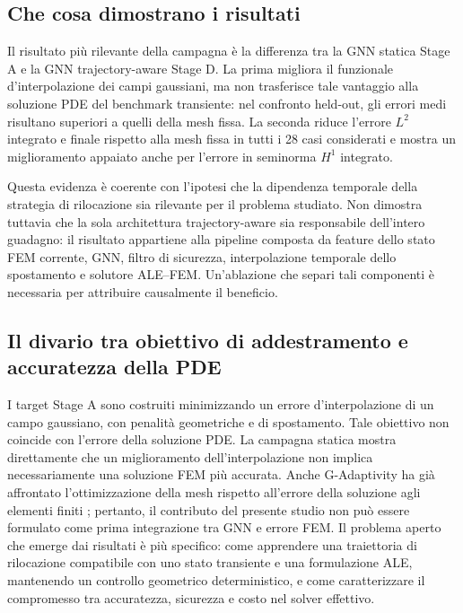 \subsection{Che cosa dimostrano i risultati}

Il risultato più rilevante della campagna è la differenza tra la GNN statica Stage A e la GNN trajectory-aware Stage D. La prima migliora il funzionale d'interpolazione dei campi gaussiani, ma non trasferisce tale vantaggio alla soluzione PDE del benchmark transiente: nel confronto held-out, gli errori medi risultano superiori a quelli della mesh fissa. La seconda riduce l'errore $L^2$ integrato e finale rispetto alla mesh fissa in tutti i 28 casi considerati e mostra un miglioramento appaiato anche per l'errore in seminorma $H^1$ integrato.

Questa evidenza è coerente con l'ipotesi che la dipendenza temporale della strategia di rilocazione sia rilevante per il problema studiato. Non dimostra tuttavia che la sola architettura trajectory-aware sia responsabile dell'intero guadagno: il risultato appartiene alla pipeline composta da feature dello stato FEM corrente, GNN, filtro di sicurezza, interpolazione temporale dello spostamento e solutore ALE--FEM. Un'ablazione che separi tali componenti è necessaria per attribuire causalmente il beneficio.

\subsection{Il divario tra obiettivo di addestramento e accuratezza della PDE}

I target Stage A sono costruiti minimizzando un errore d'interpolazione di un campo gaussiano, con penalità geometriche e di spostamento. Tale obiettivo non coincide con l'errore della soluzione PDE. La campagna statica mostra direttamente che un miglioramento dell'interpolazione non implica necessariamente una soluzione FEM più accurata. Anche G-Adaptivity ha già affrontato l'ottimizzazione della mesh rispetto all'errore della soluzione agli elementi finiti \citep{rowbottom2025gadaptivity}; pertanto, il contributo del presente studio non può essere formulato come prima integrazione tra GNN e errore FEM. Il problema aperto che emerge dai risultati è più specifico: come apprendere una traiettoria di rilocazione compatibile con uno stato transiente e una formulazione ALE, mantenendo un controllo geometrico deterministico, e come caratterizzare il compromesso tra accuratezza, sicurezza e costo nel solver effettivo.

